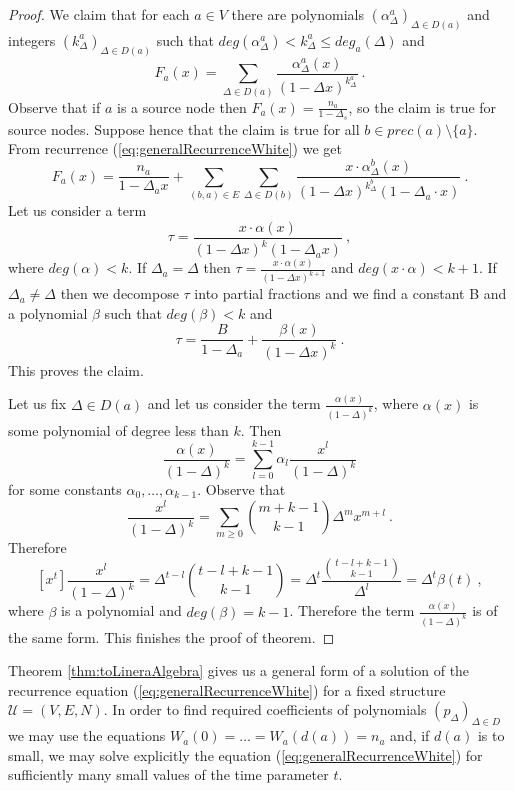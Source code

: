 \documentclass[submission]{dmtcs}
\begin{document}
\begin{proof}
We claim that for each $a\in V$ there
are polynomials $(\alpha^{a}_{\Delta})_{\Delta \in D(a)}$ and integers 
$(k^{a}_{\Delta})_{\Delta \in D(a)}$ such that 
$deg(\alpha^{a}_{\Delta}) < k^{a}_{\Delta} \leq deg_a(\Delta)$ and
$$
  F_a(x) = \sum_{\Delta\in D(a)} \frac{\alpha^{a}_{\Delta}(x)}{(1-\Delta x)^{k^{a}_{\Delta}}}~.
$$
Observe that if $a$ is a source node then $F_a(x) = \frac{n_a}{1-\Delta_s}$, 
so the claim is true for source nodes.
Suppose hence that the claim is true for all $b\in prec(a) \setminus \{a\}$.
From recurrence (\ref{eq:generalRecurrenceWhite}) we get
$$ 
F_a(x) = \frac{n_a}{1-\Delta_{a} x} +
         \sum_{(b,a)\in E}
				 \sum_{\Delta\in D(b)} \frac{x\cdot\alpha^{b}_{\Delta}(x)}{(1-\Delta x)^{k^{b}_{\Delta}}(1-\Delta_{a} \cdot x)}~.
$$
Let us consider a term
$$
\tau = \frac{x\cdot\alpha(x)}{(1-\Delta x)^{k}(1-\Delta_{a} x)} ~,
$$
where $deg(\alpha)<k$.
If $\Delta_a = \Delta$ then 
$\tau = \frac{x\cdot\alpha(x)}{(1-\Delta x)^{k+1}}$ and
$deg(x\cdot\alpha)< k+1$. If $\Delta_a \neq \Delta$ then we decompose 
$\tau$ into partial fractions and we find a constant B and a polynomial $\beta$ 
such that $deg(\beta)<k$ and
$$
  \tau = \frac{B}{1-\Delta_a} + \frac{\beta(x)}{(1-\Delta x)^{k}}~.
$$
This proves the claim.

Let us fix $\Delta \in D(a)$ and let us consider the term 
$\frac{\alpha(x)}{(1-\Delta)^k}$, where $\alpha(x)$ is some polynomial of degree
less than $k$. Then
$$
  \frac{\alpha(x)}{(1-\Delta)^k} = \sum_{l=0}^{k-1} \alpha_l\frac{x^l}{(1-\Delta)^k}
$$
for some constants $\alpha_0,\ldots,\alpha_{k-1}$.
Observe that
$$
  \frac{x^l}{(1-\Delta)^k} = 
	\sum_{m\geq 0} \binom{m+k-1}{k-1} \Delta^m x^{m+l}~.
$$
Therefore
$$
[x^t]\frac{x^l}{(1-\Delta)^k} =  \Delta^{t-l} \binom{t-l+k-1}{k-1} =
\Delta^{t} \frac{\binom{t-l+k-1}{k-1}}{\Delta^l} =
\Delta^{t} \beta(t)~,
$$
where $\beta$ is a polynomial and $deg(\beta) = k-1$.
Therefore the term $\frac{\alpha(x)}{(1-\Delta)^k}$ is of the same form.
This finishes the proof of theorem.
\end{proof}

Theorem \ref{thm:toLineraAlgebra} gives us a general form of a solution
of the recurrence equation (\ref{eq:generalRecurrenceWhite}) for a fixed structure
$\mathcal{U} = (V,E,N)$. In order to find required coefficients 
of polynomials $(p_\Delta)_{\Delta\in D}$
we may use the equations 
$W_a(0) = \ldots = W_a(d(a)) = n_a$ and, if $d(a)$ is to small, 
we may solve explicitly the equation (\ref{eq:generalRecurrenceWhite}) for
sufficiently many small values of the time parameter $t$.
\end{document}
